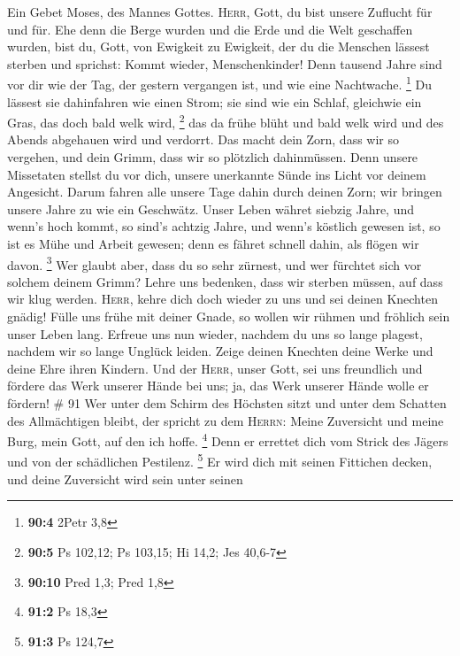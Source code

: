  Ein Gebet Moses, des Mannes Gottes. \textsc{Herr}, Gott,
du bist unsere Zuflucht für und für.  Ehe denn die Berge
wurden und die Erde und die Welt geschaffen wurden, bist du, Gott, von
Ewigkeit zu Ewigkeit,  der du die Menschen lässest sterben
und sprichst: Kommt wieder, Menschenkinder!  Denn tausend
Jahre sind vor dir wie der Tag, der gestern vergangen ist, und wie eine
Nachtwache. \footnote{\textbf{90:4} 2Petr 3,8}  Du lässest
sie dahinfahren wie einen Strom; sie sind wie ein Schlaf, gleichwie ein
Gras, das doch bald welk wird, \footnote{\textbf{90:5} Ps 102,12; Ps
  103,15; Hi 14,2; Jes 40,6-7}  das da frühe blüht und
bald welk wird und des Abends abgehauen wird und verdorrt.
 Das macht dein Zorn, dass wir so vergehen, und dein
Grimm, dass wir so plötzlich dahinmüssen.  Denn unsere
Missetaten stellst du vor dich, unsere unerkannte Sünde ins Licht vor
deinem Angesicht.  Darum fahren alle unsere Tage dahin
durch deinen Zorn; wir bringen unsere Jahre zu wie ein Geschwätz.
 Unser Leben währet siebzig Jahre, und wenn's hoch kommt,
so sind's achtzig Jahre, und wenn's köstlich gewesen ist, so ist es Mühe
und Arbeit gewesen; denn es fähret schnell dahin, als flögen wir davon.
\footnote{\textbf{90:10} Pred 1,3; Pred 1,8}  Wer glaubt
aber, dass du so sehr zürnest, und wer fürchtet sich vor solchem deinem
Grimm?  Lehre uns bedenken, dass wir sterben müssen, auf
dass wir klug werden.  \textsc{Herr}, kehre dich doch
wieder zu uns und sei deinen Knechten gnädig!  Fülle uns
frühe mit deiner Gnade, so wollen wir rühmen und fröhlich sein unser
Leben lang.  Erfreue uns nun wieder, nachdem du uns so
lange plagest, nachdem wir so lange Unglück leiden. 
Zeige deinen Knechten deine Werke und deine Ehre ihren Kindern.
 Und der \textsc{Herr}, unser Gott, sei uns freundlich
und fördere das Werk unserer Hände bei uns; ja, das Werk unserer Hände
wolle er fördern! \# 91  Wer unter dem Schirm des Höchsten
sitzt und unter dem Schatten des Allmächtigen bleibt,  der
spricht zu dem \textsc{Herrn}: Meine Zuversicht und meine Burg, mein
Gott, auf den ich hoffe. \footnote{\textbf{91:2} Ps 18,3} 
Denn er errettet dich vom Strick des Jägers und von der schädlichen
Pestilenz. \footnote{\textbf{91:3} Ps 124,7}  Er wird dich
mit seinen Fittichen decken, und deine Zuversicht wird sein unter seinen
